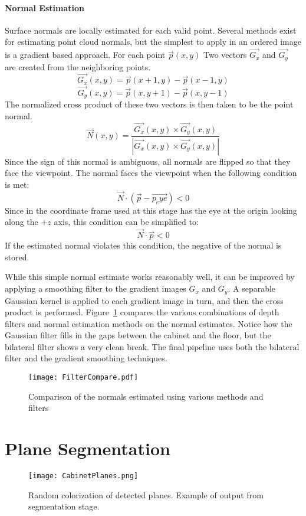 \paragraph{Normal Estimation}
Surface normals are locally estimated for each valid point. Several methods exist for estimating point cloud normals, but the simplest to apply in an ordered image is a gradient based approach. For each point $\vec{p}(x,y)$ Two vectors $\vec{G_x}$ and $\vec{G_y}$ are created from the neighboring points. $$\vec{G_x}(x,y)=\vec{p}(x+1,y)-\vec{p}(x-1,y)$$ $$\vec{G_y}(x,y)=\vec{p}(x,y+1)-\vec{p}(x,y-1)$$
The normalized cross product of these two vectors is then taken to be the point normal. $$\vec{N}(x,y)= \frac{\vec{G_x}(x,y) \times \vec{G_y}(x,y)}{|\vec{G_x}(x,y) \times \vec{G_y}(x,y)|}$$
Since the sign of this normal is ambiguous, all normals are flipped so that they face the viewpoint. The normal faces the viewpoint when the following condition is met: $$\vec{N} \cdot (\vec{p}-\vec{p_eye}) < 0$$
Since in the coordinate frame used at this stage has the eye at the origin looking along the $+z$ axis, this condition can be simplified to: $$\vec{N} \cdot \vec{p} < 0$$
If the estimated normal violates this condition, the negative of the normal is stored.\par
While this simple normal estimate works reasonably well, it can be improved by applying a smoothing filter to the gradient images $G_x$ and $G_y$. A separable Gaussian kernel is applied to each gradient image in turn, and then the cross product is performed. Figure~\ref{fig:filtercompare} compares the various combinations of depth filters and normal estimation methods on the normal estimates. Notice how the Gaussian filter fills in the gaps between the cabinet and the floor, but the bilateral filter shows a very clean break. The final pipeline uses both the bilateral filter and the gradient smoothing techniques.

\begin{figure}[ht]
    \centering
    \texttt{[image: FilterCompare.pdf]}
    \caption{Comparison of the normals estimated using various methods and filters}
    \label{fig:filtercompare}
\end{figure}

\section{Plane Segmentation}
\begin{figure}[ht]
    \centering
    \texttt{[image: CabinetPlanes.png]}
    \caption{Random colorization of detected planes. Example of output from segmentation stage.}
    \label{fig:segmentationoutput}
\end{figure}


